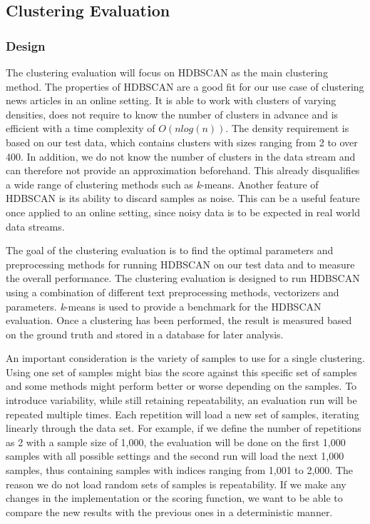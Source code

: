 \subsection{Clustering Evaluation}
\label{subsec:4b_clustering_evaluation}

\subsubsection{Design}
\label{subsubsec:4b_design}

The clustering evaluation will focus on HDBSCAN as the main clustering method. 
The properties of HDBSCAN are a good fit for our use case of clustering news articles in an online setting.
It is able to work with clusters of varying densities, 
does not require to know the number of clusters in advance 
and is efficient with a time complexity of $O(nlog(n))$.
The density requirement is based on our test data, which contains clusters with sizes ranging from 2 to over 400. 
In addition, we do not know the number of clusters in the data stream and can therefore not provide an approximation
beforehand. This already disqualifies a wide range of clustering methods such as \textit{k}-means. 
Another feature of HDBSCAN is its ability to discard samples as noise. 
This can be a useful feature once applied to an online setting, 
since noisy data is to be expected in real world data streams.

The goal of the clustering evaluation is to find the optimal parameters and preprocessing methods
for running HDBSCAN on our test data and to measure the overall performance.
The clustering evaluation is designed to run HDBSCAN using a combination of different text preprocessing methods, vectorizers and parameters.
\textit{k}-means is used to provide a benchmark for the HDBSCAN evaluation.
Once a clustering has been performed,
the result is measured based on the ground truth and stored in a database for later analysis.

An important consideration is the variety of samples to use for a single clustering.
Using one set of samples might bias the score against this specific set of samples
and some methods might perform better or worse depending on the samples.
To introduce variability, while still retaining repeatability, an evaluation run will be repeated multiple times.
Each repetition will load a new set of samples, iterating linearly through the data set.
For example, if we define the number of repetitions as 2 with a sample size of 1,000,
the evaluation will be done on the first 1,000 samples with all possible settings
and the second run will load the next 1,000 samples, thus containing samples with indices ranging from 1,001 to 2,000.
The reason we do not load random sets of samples is repeatability.
If we make any changes in the implementation or the scoring function,
we want to be able to compare the new results with the previous ones in a deterministic manner.

